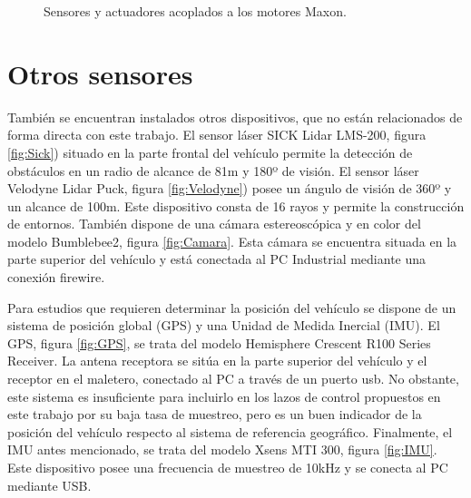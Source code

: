 \begin{figure}[!ht]
\centering
	\caption{Sensores y actuadores acoplados a los motores Maxon.}
\end{figure}

\section{Otros sensores}
También se encuentran instalados otros dispositivos, que no están relacionados de forma directa con este trabajo. El sensor láser SICK Lidar LMS-200, figura \ref{fig:Sick}) situado en la parte frontal del vehículo permite la detección de obstáculos en un radio de alcance de 81m y 180º de visión. El sensor láser Velodyne Lidar Puck, figura \ref{fig:Velodyne}) posee un ángulo de visión de 360º y un alcance de 100m. Este dispositivo consta de 16 rayos y permite la construcción de entornos. También dispone de una cámara estereoscópica y en color del modelo Bumblebee2, figura \ref{fig:Camara}. Esta cámara se encuentra situada en la parte superior del vehículo y está conectada al PC Industrial mediante una conexión firewire.

Para estudios que requieren determinar la posición del vehículo se dispone de un sistema de posición global (GPS) y una Unidad de Medida Inercial (IMU). El GPS, figura \ref{fig:GPS}, se trata del modelo Hemisphere Crescent R100 Series Receiver. La antena receptora se sitúa en la parte superior del vehículo y el receptor en el maletero, conectado al PC a través de un puerto usb. No obstante, este sistema es insuficiente para incluirlo en los lazos de control propuestos en este trabajo por su baja tasa de muestreo, pero es un buen indicador de la posición del vehículo respecto al sistema de referencia geográfico. Finalmente, el IMU antes mencionado, se trata del modelo Xsens MTI 300, figura \ref{fig:IMU}. Este dispositivo posee una frecuencia de muestreo de 10kHz y se conecta al PC mediante USB.

